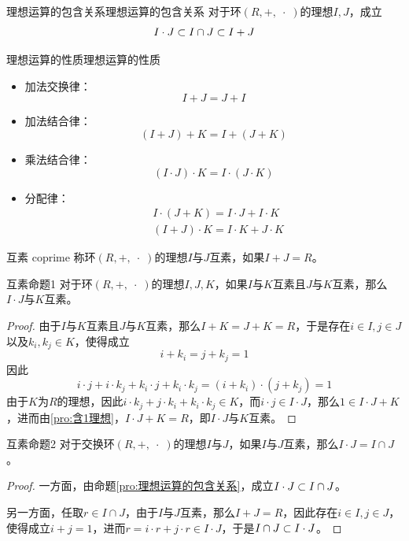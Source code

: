 \begin{proposition}{理想运算的包含关系}{理想运算的包含关系}
	对于环$(R,+,\;\cdot\;)$的理想$I,J$，成立
	$$
	I\cdot J\subset I\cap J\subset I+J
	$$
\end{proposition}

\begin{proposition}{理想运算的性质}{理想运算的性质}
	\begin{itemize}
		\item 加法交换律：
		$$
		I+J=J+I
		$$
		\item 加法结合律：
		$$
		(I+J)+K=I+(J+K)
		$$
		\item 乘法结合律：
		$$
		(I\cdot J)\cdot K=I\cdot (J\cdot K)
		$$
		\item 分配律：
		\begin{align*}
			&I\cdot (J+K)=I\cdot J+I\cdot K\\
			&(I+J)\cdot K=I\cdot K+J\cdot K
		\end{align*}
	\end{itemize}
\end{proposition}

\begin{definition}{互素 coprime}
	称环$(R,+,\;\cdot\;)$的理想$I$与$J$互素，如果$I+J=R$。
\end{definition}

\begin{proposition}{}{互素命题1}
	对于环$(R,+,\;\cdot\;)$的理想$I,J,K$，如果$I$与$K$互素且$J$与$K$互素，那么$I\cdot J$与$K$互素。
\end{proposition}

\begin{proof}
	由于$I$与$K$互素且$J$与$K$互素，那么$I+K=J+K=R$，于是存在$i\in I,j\in J$以及$k_i,k_j\in K$，使得成立
	$$
	i+k_i=j+k_j=1
	$$
	因此
	$$
	i\cdot j+i\cdot k_j+k_i\cdot j+k_i\cdot k_j
	=(i+k_i)\cdot(j+k_j)
	=1
	$$
	由于$K$为$R$的理想，因此$i\cdot k_j+j\cdot k_i+k_i\cdot k_j\in K$，而$i\cdot j\in I\cdot J$，那么$1\in I\cdot J+K$，进而由\ref{pro:含1理想}，$I\cdot J+K=R$，即$I\cdot J$与$K$互素。
\end{proof}

\begin{proposition}{}{互素命题2}
	对于交换环$(R,+,\;\cdot\;)$的理想$I$与$J$，如果$I$与$J$互素，那么$I\cdot J=I\cap J$。
\end{proposition}

\begin{proof}
	一方面，由命题\ref{pro:理想运算的包含关系}，成立$I\cdot J\subset I\cap J$。
	
	另一方面，任取$r\in I\cap J$，由于$I$与$J$互素，那么$I+J=R$，因此存在$i\in I,j\in J$，使得成立$i+j=1$，进而$r=i\cdot r+j\cdot r\in I\cdot J$，于是$I\cap J\subset I\cdot J$。
\end{proof}

